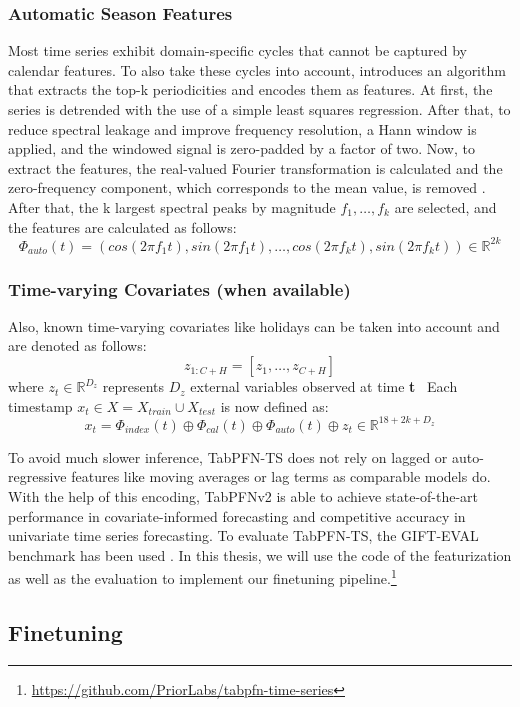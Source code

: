 \subsubsection{Automatic Season Features}
Most time series exhibit domain-specific cycles that cannot be captured by calendar features.
To also take these cycles into account, \citet{hoo2025tables} introduces an algorithm that extracts the top-k periodicities and encodes them as features.
At first, the series is detrended with the use of a simple least squares regression.
After that, to reduce spectral leakage and improve frequency resolution, a Hann window is applied, and the windowed signal is zero-padded by a factor of two.
Now, to extract the features, the real-valued Fourier transformation is calculated and the zero-frequency component, which corresponds to the mean value, is removed \citet{hoo2025tables}.
After that, the k largest spectral peaks by magnitude $f_1, …, f_k$ are selected, and the features are calculated as follows:
\[
\Phi_{auto}(t) = (cos(2\pi f_1 t), sin(2 \pi f_1 t), …, cos(2\pi f_k t), sin(2 \pi f_k t)) \in \mathbb{R}^{2k}
\]
\subsubsection{Time-varying Covariates (when available)}
Also, known time-varying covariates like holidays can be taken into account and are denoted as follows:
\[
z_{1:C+H} = [z_1, …, z_{C+H}]
\]
where $z_t \in \mathbb{R}^{D_{z}}$ represents $D_z$ external variables observed at time \textbf{t}
\newline
\
Each timestamp $x_t \in X=X_{train} \cup X_{test}$ is now defined as:
\[
x_t = \Phi_{index}(t) \oplus \Phi_{cal}(t) \oplus \Phi_{auto}(t) \oplus z_t \in \mathbb{R}^{18+2k+D_z}
\]

To avoid much slower inference, TabPFN-TS does not rely on lagged or auto-regressive features like moving averages or lag terms as comparable models do.
\newline
With the help of this encoding, TabPFNv2 is able to achieve state-of-the-art performance in covariate-informed forecasting and competitive accuracy in univariate time series forecasting.
To evaluate TabPFN-TS, the GIFT-EVAL benchmark has been used \citep{hoo2025tables}.
\newline
In this thesis, we will use the code of the featurization as well as the evaluation to implement our finetuning pipeline.\footnote{\url{https://github.com/PriorLabs/tabpfn-time-series}}
\subsection{Finetuning}
